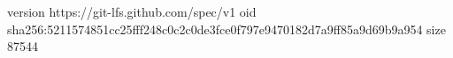 version https://git-lfs.github.com/spec/v1
oid sha256:5211574851cc25fff248c0c2c0de3fce0f797e9470182d7a9ff85a9d69b9a954
size 87544
